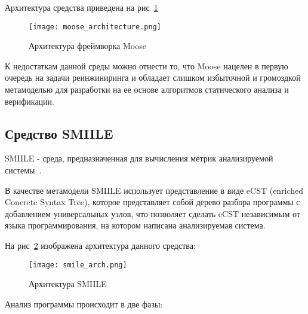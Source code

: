 Архитектура средства приведена на рис~\ref{fig:moose_architecture}

\begin{figure}[ht!]
    \begin{center}
        \texttt{[image: moose\_architecture.png]}
    \end{center}
    \caption{Архитектура фреймворка Moose}
    \label{fig:moose_architecture}
\end{figure}

К недостаткам данной среды можно отнести то, что Moose нацелен в первую очередь
на задачи реинжиниринга и обладает слишком избыточной и громоздкой метамоделью
для разработки на ее основе алгоритмов статического анализа и верификации.

\subsection{Средство SMIILE}



SMIILE - среда, предназначенная для вычисления метрик анализируемой
системы~\cite{smile}.

В качестве метамодели SMIILE использует представление в виде eCST (enriched
Concrete Syntax Tree), которое представляет собой дерево разбора программы с
добавлением универсальных узлов, что позволяет сделать eCST независимым от
языка программирования, на котором написана анализируемая система.

На рис~\ref{fig:smile_arch} изображена архитектура данного средства:

\begin{figure}[ht!]
    \begin{center}
        \texttt{[image: smile\_arch.png]}
    \end{center}
    \caption{Архитектура SMIILE}
    \label{fig:smile_arch}
\end{figure}

Анализ программы происходит в две фазы:

